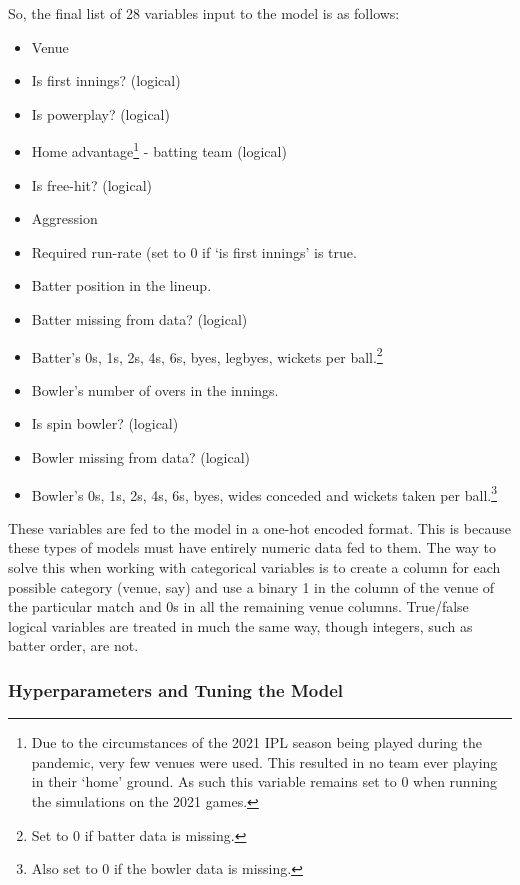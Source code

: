 So, the final list of 28 variables input to the model is as follows:
\begin{itemize}
    \itemsep-0.25em
    \renewcommand\labelitemi{-}
    \item Venue
    \item Is first innings? (logical)
    \item Is powerplay? (logical)
    \item Home advantage\footnote{Due to the circumstances of the 2021 IPL season being played during the pandemic, very few venues were used. This resulted in no team ever playing in their `home' ground. As such this variable remains set to 0 when running the simulations on the 2021 games.} - batting team (logical)
    \item Is free-hit? (logical)
    \item Aggression
    \item Required run-rate (set to 0 if `is first innings' is true.
    \item Batter position in the lineup.
    \item Batter missing from data? (logical)
    \item Batter's 0s, 1s, 2s, 4s, 6s, byes, legbyes, wickets per ball.\footnote{Set to 0 if batter data is missing.}
    \item Bowler's number of overs in the innings.
    \item Is spin bowler? (logical)
    \item Bowler missing from data? (logical)
    \item Bowler's 0s, 1s, 2s, 4s, 6s, byes, wides conceded and wickets taken per ball.\footnote{Also set to 0 if the bowler data is missing.}
\end{itemize}

These variables are fed to the model in a one-hot encoded format. This is because these types of models must have entirely numeric data fed to them. The way to solve this when working with categorical variables is to create a column for each possible category (venue, say) and use a binary 1 in the column of the venue of the particular match and 0s in all the remaining venue columns. True/false logical variables are treated in much the same way, though integers, such as batter order, are not.

\subsubsection{Hyperparameters and Tuning the Model}

